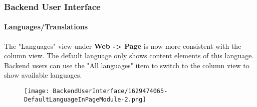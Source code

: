 %

\begin{frame}[fragile]
	\frametitle{Backend User Interface}
	\framesubtitle{Languages/Translations}

	The "Languages" view under \textbf{Web -> Page} is now more consistent with
	the column view. The default language only shows content elements of this
	language. Backend users can use the "All languages" item to switch to the
	column view to show available languages.

	\begin{figure}
		\texttt{[image: BackendUserInterface/1629474065-DefaultLanguageInPageModule-2.png]}
	\end{figure}

\end{frame}

